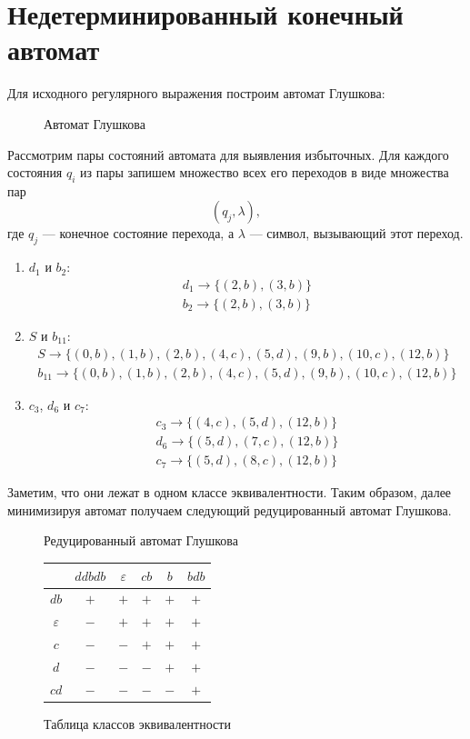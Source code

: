 \documentclass[a4paper, 14pt]{extarticle}
\begin{document}
\section{Недетерминированный конечный автомат}
Для исходного регулярного выражения построим автомат Глушкова:
\begin{figure}[H]
\centering
\scalebox{1.2}{}
\caption{Автомат Глушкова}
\end{figure}
Рассмотрим пары состояний автомата для выявления избыточных. 
Для каждого состояния $q_i$ из пары запишем множество всех его переходов в виде множества пар 
\[
(q_j, \lambda),
\] 
где $q_j$ — конечное состояние перехода, а $\lambda$ — символ, вызывающий этот переход.
\begin{enumerate}
  \itemsep -0.8pt
  \item $d_1$ и $b_2$:
    \begin{gather*}
      d_1 \to \{(2, b), (3, b)\}\\
      b_2 \to \{(2, b), (3, b)\}
    \end{gather*}
  \item $S$ и $b_{11}$:
    \begin{gather*}
      S \to \{(0, b), (1, b), (2, b), (4, c), (5, d), (9, b), (10, c), (12, b)\}\\
      b_{11} \to \{(0, b), (1, b), (2, b), (4, c), (5, d), (9, b), (10, c), (12, b)\}
    \end{gather*}
  \item $c_3$, $d_6$ и $c_7$:
    \begin{gather*}
      c_3 \to \{(4, c), (5, d), (12, b)\}\\
      d_6 \to \{(5, d), (7, c), (12, b)\}\\
      c_7 \to \{(5, d), (8, c), (12, b)\}
    \end{gather*}
\end{enumerate}
Заметим, что они лежат в одном классе эквивалентности. Таким образом, далее минимизируя автомат получаем следующий редуцированный автомат Глушкова.
\begin{figure}[h]
\centering

\caption{Редуцированный автомат Глушкова}
\end{figure}
\begin{figure}[H]
\centering
\begin{tabular}{|c|c|c|c|c|c|}
\hline
 & $ddbdb$ & $\varepsilon$ & $cb$ & $b$ & $bdb$ \\
\hline
$db$ & $+$ & $+$ & $+$ & $+$ & $+$ \\
\hline
$\varepsilon$  & $-$ & $+$ & $+$ & $+$ & $+$ \\
\hline
$c$  & $-$ & $-$ & $+$ & $+$ & $+$ \\
\hline
$d$ & $-$ & $-$ & $-$ & $+$ & $+$ \\
\hline
$cd$ & $-$ & $-$ & $-$ & $-$ & $+$ \\
\hline
\end{tabular}
\caption{Таблица классов эквивалентности}
\end{figure}
\end{document}
